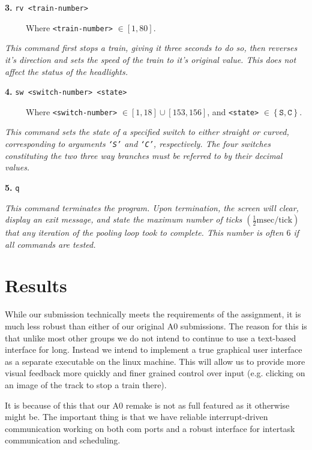 \documentclass{article}
\begin{document}
\vspace{0.5cm}
\textbf{3.} \texttt{rv <train-number>}

\ \ \ \ \ Where \texttt{<train-number>} $\in [1,80]$.

\vspace{0.3cm}
\textit{This command first stops a train, giving it three seconds to do so, then reverses it's direction and sets the speed of the train to it's original value. This does not affect the status of the headlights.}

\vspace{0.5cm}
\textbf{4.} \texttt{sw <switch-number> <state>}

\ \ \ \ \ Where \texttt{<switch-number>} $\in [1,18] \cup [153,156]$, and
\texttt{<state>} $\in \left\{\texttt{S}, \texttt{C}\right\}$.

\vspace{0.3cm}
\textit{This command sets the state of a specified switch to either straight or curved, corresponding to arguments \texttt{`S'} and \texttt{`C'}, respectively. The four switches constituting the two three way branches must be referred to by their decimal values.}

\vspace{0.3cm}
\textbf{5.} \texttt{q}

\vspace{0.3cm}
\textit{This command terminates the program. Upon termination, the screen will
clear, display an exit message, and state the maximum number of ticks
$\left(\frac{1}{2} \text{msec} / \text{tick}\right)$ that any iteration of the pooling loop took to complete. This number is often $6$ if all commands are tested.}

\section*{Results}

While our submission technically meets the requirements of the assignment, it is
much less robust than either of our original A0 submissions. The reason for this
is that unlike most other groups we do not intend to continue to use a
text-based interface for long. Instead we intend to implement a true graphical
user interface as a separate executable on the linux machine. This will allow us
to provide more visual feedback more quickly and finer grained control over
input (e.g. clicking on an image of the track to stop a train there).

It is because of this that our A0 remake is not as full featured as it otherwise
might be. The important thing is that we have reliable interrupt-driven
communication working on both com ports and a robust interface for intertask
communication and scheduling.
\end{document}
